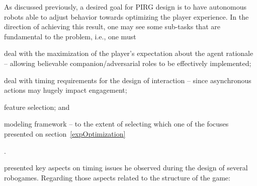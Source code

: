 As discussed previously, a desired goal for PIRG design is to have autonomous robots able to adjust behavior towards optimizing the player experience. In the direction of achieving this result, one may see some sub-tasks that are fundamental to the problem, i.e., one must \begin{inparaenum}\item deal with the maximization of the player's expectation about the agent rationale -- allowing believable companion/adversarial roles to be effectively implemented; \item deal with timing requirements for the design of interaction -- since asynchronous actions may hugely impact engagement; \item feature selection; and \item modeling framework -- to the extent of selecting which one of the focuses presented on section~\ref{expOptimization}\end{inparaenum}.

\cite{bonarini_timing_2014} presented key aspects on timing issues he observed during the design of several robogames. Regarding those aspects related to the structure of the game:

